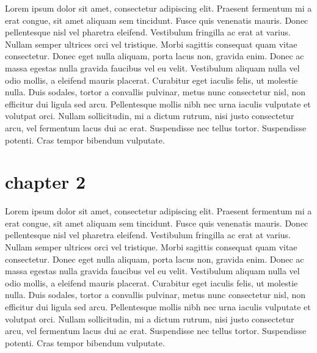 \documentclass[a4paper, 12pt]{scrbook}
\begin{document}
Lorem ipsum dolor sit amet, consectetur adipiscing elit. Praesent fermentum mi a erat congue, sit amet aliquam sem tincidunt. Fusce quis venenatis mauris. Donec pellentesque nisl vel pharetra eleifend. Vestibulum fringilla ac erat at varius. Nullam semper ultrices orci vel tristique. Morbi sagittis consequat quam vitae consectetur. Donec eget nulla aliquam, porta lacus non, gravida enim. Donec ac massa egestas nulla gravida faucibus vel eu velit. Vestibulum aliquam nulla vel odio mollis, a eleifend mauris placerat. Curabitur eget iaculis felis, ut molestie nulla. Duis sodales, tortor a convallis pulvinar, metus nunc consectetur nisl, non efficitur dui ligula sed arcu. Pellentesque mollis nibh nec urna iaculis vulputate et volutpat orci. Nullam sollicitudin, mi a dictum rutrum, nisi justo consectetur arcu, vel fermentum lacus dui ac erat. Suspendisse nec tellus tortor. Suspendisse potenti. Cras tempor bibendum vulputate.




\chapter{chapter 2}

Lorem ipsum dolor sit amet, consectetur adipiscing elit. Praesent fermentum mi a erat congue, sit amet aliquam sem tincidunt. Fusce quis venenatis mauris. Donec pellentesque nisl vel pharetra eleifend. Vestibulum fringilla ac erat at varius. Nullam semper ultrices orci vel tristique. Morbi sagittis consequat quam vitae consectetur. Donec eget nulla aliquam, porta lacus non, gravida enim. Donec ac massa egestas nulla gravida faucibus vel eu velit. Vestibulum aliquam nulla vel odio mollis, a eleifend mauris placerat. Curabitur eget iaculis felis, ut molestie nulla. Duis sodales, tortor a convallis pulvinar, metus nunc consectetur nisl, non efficitur dui ligula sed arcu. Pellentesque mollis nibh nec urna iaculis vulputate et volutpat orci. Nullam sollicitudin, mi a dictum rutrum, nisi justo consectetur arcu, vel fermentum lacus dui ac erat. Suspendisse nec tellus tortor. Suspendisse potenti. Cras tempor bibendum vulputate.
\end{document}

